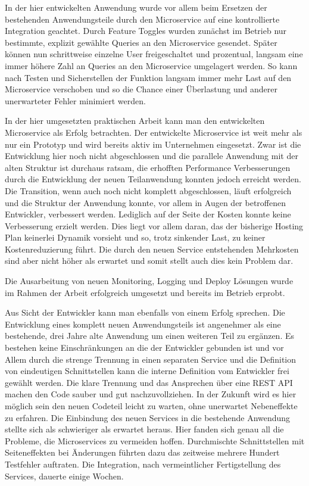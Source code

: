 In der hier entwickelten Anwendung wurde vor allem beim Ersetzen der bestehenden Anwendungsteile durch den Microservice auf eine kontrollierte Integration geachtet. Durch Feature Toggles wurden zunächst im Betrieb nur bestimmte, explizit gewählte Queries an den Microservice gesendet. Später können nun schrittweise einzelne User freigeschaltet und prozentual, langsam eine immer höhere Zahl an Queries an den Microservice umgelagert werden. So kann nach Testen und Sicherstellen der Funktion langsam immer mehr Last auf den Microservice verschoben und so die Chance einer Überlastung und anderer unerwarteter Fehler minimiert werden.

In der hier umgesetzten praktischen Arbeit kann man den entwickelten Microservice als Erfolg betrachten. Der entwickelte Microservice ist weit mehr als nur ein Prototyp und wird bereits aktiv im Unternehmen eingesetzt. Zwar ist die Entwicklung hier noch nicht abgeschlossen und die parallele Anwendung mit der alten Struktur ist durchaus ratsam, die erhofften Performance Verbesserungen durch die Entwicklung der neuen Teilanwendung konnten jedoch erreicht werden. Die Transition, wenn auch noch nicht komplett abgeschlossen, läuft erfolgreich und die Struktur der Anwendung konnte, vor allem in Augen der betroffenen Entwickler, verbessert werden. Lediglich auf der Seite der Kosten konnte keine Verbesserung erzielt werden. Dies liegt vor allem daran, das der bisherige Hosting Plan keinerlei Dynamik vorsieht und so, trotz sinkender Last, zu keiner Kostenreduzierung führt. Die durch den neuen Service entstehenden Mehrkosten sind aber nicht höher als erwartet und somit stellt auch dies kein Problem dar.

Die Ausarbeitung von neuen Monitoring, Logging und Deploy Lösungen wurde im Rahmen der Arbeit erfolgreich umgesetzt und bereits im Betrieb erprobt.

Aus Sicht der Entwickler kann man ebenfalls von einem Erfolg sprechen. Die Entwicklung eines komplett neuen Anwendungsteils ist  angenehmer als eine bestehende, drei Jahre alte Anwendung um einen weiteren Teil zu ergänzen. Es bestehen keine Einschränkungen an die der Entwickler gebunden ist und vor Allem durch die strenge Trennung in einen separaten Service und die Definition von eindeutigen Schnittstellen kann die interne Definition vom Entwickler frei gewählt werden. Die klare Trennung und das Ansprechen über eine REST API machen den Code sauber und gut nachzuvollziehen. In der Zukunft wird es hier möglich sein den neuen Codeteil leicht zu warten, ohne unerwartet Nebeneffekte zu erfahren. Die Einbindung des neuen Services in die bestehende Anwendung stellte sich als schwieriger als erwartet heraus. Hier fanden sich genau all die Probleme, die Microservices zu vermeiden hoffen. Durchmischte Schnittstellen mit Seiteneffekten bei Änderungen führten dazu das zeitweise mehrere Hundert Testfehler auftraten. Die Integration, nach vermeintlicher Fertigstellung des Services, dauerte einige Wochen.

